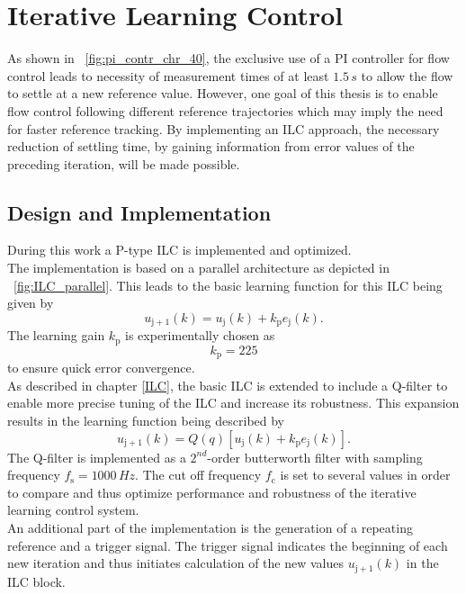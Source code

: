 \section{Iterative Learning Control}\label{ILC_1}
As shown in \figurename~\ref{fig:pi_contr_chr_40}, the exclusive use of a PI controller for flow control leads to necessity of measurement times of at least $1.5\,s$ to allow the flow to settle at a new reference value. However, one goal of this thesis is to enable flow control following different reference trajectories which may imply the need for faster reference tracking. By implementing an ILC approach, the necessary reduction of settling time, by gaining information from error values of the preceding iteration, will be made possible.
\subsection{Design and Implementation}
During this work a P-type ILC is implemented and optimized.
\\The implementation is based on a parallel architecture as depicted in \figurename~\ref{fig:ILC_parallel}. This leads to the basic learning function for this ILC being given by
\begin{equation}
  u_{\mathrm{j+1}}(k) = u_{\mathrm{j}}(k)+k_{\mathrm{p}}e_{\mathrm{j}}(k).
\end{equation}
The learning gain $k_{\mathrm{p}}$ is experimentally chosen as
\begin{equation}
  k_{\mathrm{p}} = 225
\end{equation}
to ensure quick error convergence.
\\As described in chapter \ref{ILC}, the basic ILC is extended to include a Q-filter to enable more precise tuning of the ILC and increase its robustness.
This expansion results in the learning function being described by
\begin{equation}
  u_{\mathrm{j+1}}(k) = Q(q)[u_{\mathrm{j}}(k)+k_{\mathrm{p}}e_{\mathrm{j}}(k)].
\end{equation}
The Q-filter is implemented as a $2^{nd}$-order butterworth filter with sampling frequency $f_{\mathrm{s}}=1000\,Hz$. The cut off frequency $f_{\mathrm{c}}$ is set to several values in order to compare and thus optimize performance and robustness of the iterative learning control system.
\\An additional part of the implementation is the generation of a repeating reference and a trigger signal. The trigger signal indicates the beginning of each new iteration and thus initiates calculation of the new values $u_{\mathrm{j+1}}(k)$ in the ILC block.
